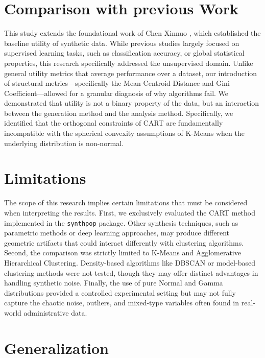 \section{Comparison with previous Work}
\label{sec:comparison}

This study extends the foundational work of Chen Xinnuo \cite{chen2025}, which established the baseline utility of synthetic data. While previous studies largely focused on supervised learning tasks, such as classification accuracy, or global statistical properties, this research specifically addressed the unsupervised domain. Unlike general utility metrics that average performance over a dataset, our introduction of structural metrics---specifically the Mean Centroid Distance and Gini Coefficient---allowed for a granular diagnosis of why algorithms fail. We demonstrated that utility is not a binary property of the data, but an interaction between the generation method and the analysis method. Specifically, we identified that the orthogonal constraints of CART are fundamentally incompatible with the spherical convexity assumptions of K-Means when the underlying distribution is non-normal.

\section{Limitations}
\label{sec:limitations-conclusions}

The scope of this research implies certain limitations that must be considered when interpreting the results. First, we exclusively evaluated the CART method implemented in the \texttt{synthpop} package. Other synthesis techniques, such as parametric methods or deep learning approaches, may produce different geometric artifacts that could interact differently with clustering algorithms. Second, the comparison was strictly limited to K-Means and Agglomerative Hierarchical Clustering. Density-based algorithms like DBSCAN or model-based clustering methods were not tested, though they may offer distinct advantages in handling synthetic noise. Finally, the use of pure Normal and Gamma distributions provided a controlled experimental setting but may not fully capture the chaotic noise, outliers, and mixed-type variables often found in real-world administrative data.

\section{Generalization}
\label{sec:generalization-conclusions}

